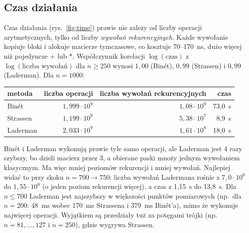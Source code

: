 \documentclass[11pt,a4paper]{article}
\begin{document}
\subsection{Czas działania}
Czas działania (rys.~\ref{fig:time}) prawie nie zależy od liczby operacji
arytmetycznych, tylko od liczby \emph{wywołań rekurencyjnych}. Każde wywołanie kopiuje bloki i alokuje macierze
tymczasowe, co kosztuje 70--170~ns, dużo więcej niż pojedyncze $+$ lub $*$. Współczynnik korelacji
$\log(\text{czas})$ z $\log(\text{liczba wywołań})$ dla $n\ge250$ wynosi $1{,}00$ (Binét), $0{,}99$ (Strassen)
i $0{,}99$ (Laderman). Dla $n=1000$:
\begin{center}
\begin{tabular}{lrrr}
\toprule
metoda & liczba operacji & liczba wywołań rekurencyjnych & czas \\
\midrule
Binét    & $1{,}999\cdot10^{9}$ & $1{,}08\cdot10^{9}$ & 73,0~s \\
Strassen & $1{,}199\cdot10^{9}$ & $5{,}38\cdot10^{7}$ & 8,9~s \\
Laderman & $2{,}033\cdot10^{9}$ & $1{,}61\cdot10^{8}$ & 18,0~s \\
\bottomrule
\end{tabular}
\end{center}
Binét i Laderman wykonują prawie tyle samo operacji, ale Laderman jest 4 razy szybszy, bo dzieli macierz przez 3,
a obierane paski mnoży jednym wywołaniem klasycznym. Ma więc mniej poziomów rekurencji i mniej wywołań.
Najlepiej widać to przy skoku $n=700\to750$: liczba wywołań Ladermana rośnie z $7{,}0\cdot10^{6}$ do
$1{,}55\cdot10^{8}$ (o jeden poziom rekurencji więcej), a czas z 1,15~s do 13,8~s. Dla $n\le700$ Laderman
jest najszybszy w większości punktów pomiarowych (np.\ dla $n=200$: 48~ms wobec 170~ms Strassena i 379~ms
Binét'a), mimo że wykonuje najwięcej operacji. Wyjątkiem są przedziały tuż za potęgami trójki
(np.\ $n=81,\dots,127$ i $n=250$), gdzie wygrywa Strassen.
\end{document}

